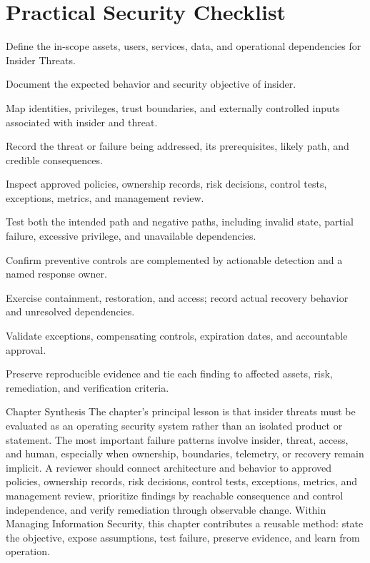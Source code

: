 \documentclass[11pt,letterpaper]{article}
\begin{document}
\section*{Practical Security Checklist}
\begin{CornellChecklist}
\item Define the in-scope assets, users, services, data, and operational dependencies for Insider Threats.
\item Document the expected behavior and security objective of insider.
\item Map identities, privileges, trust boundaries, and externally controlled inputs associated with insider and threat.
\item Record the threat or failure being addressed, its prerequisites, likely path, and credible consequences.
\item Inspect approved policies, ownership records, risk decisions, control tests, exceptions, metrics, and management review.
\item Test both the intended path and negative paths, including invalid state, partial failure, excessive privilege, and unavailable dependencies.
\item Confirm preventive controls are complemented by actionable detection and a named response owner.
\item Exercise containment, restoration, and access; record actual recovery behavior and unresolved dependencies.
\item Validate exceptions, compensating controls, expiration dates, and accountable approval.
\item Preserve reproducible evidence and tie each finding to affected assets, risk, remediation, and verification criteria.
\end{CornellChecklist}
\begin{CornellSummaryBox}{Chapter Synthesis}
The chapter's principal lesson is that insider threats must be evaluated as an operating security system rather than an isolated product or statement. The most important failure patterns involve insider, threat, access, and human, especially when ownership, boundaries, telemetry, or recovery remain implicit. A reviewer should connect architecture and behavior to approved policies, ownership records, risk decisions, control tests, exceptions, metrics, and management review, prioritize findings by reachable consequence and control independence, and verify remediation through observable change. Within Managing Information Security, this chapter contributes a reusable method: state the objective, expose assumptions, test failure, preserve evidence, and learn from operation.
\end{CornellSummaryBox}
\end{document}
